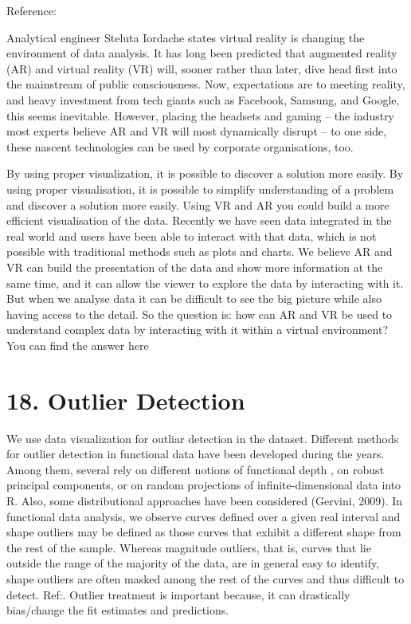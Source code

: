 \documentclass[]{book}
\theoremstyle{definition}
\theoremstyle{definition}
\theoremstyle{definition}
\theoremstyle{remark}
\begin{document}
Reference:\citep{ref_pdf_ar}

Analytical engineer Steluta Iordache states virtual reality is changing
the environment of data analysis. It has long been predicted that
augmented reality (AR) and virtual reality (VR) will, sooner rather than
later, dive head first into the mainstream of public consciousness. Now,
expectations are to meeting reality, and heavy investment from tech
giants such as Facebook, Samsung, and Google, this seems inevitable.
However, placing the headsets and gaming -- the industry most experts
believe AR and VR will most dynamically disrupt -- to one side, these
nascent technologies can be used by corporate organisations, too.

By using proper visualization, it is possible to discover a solution
more easily. By using proper visualisation, it is possible to simplify
understanding of a problem and discover a solution more easily. Using VR
and AR you could build a more efficient visualisation of the data.
Recently we have seen data integrated in the real world and users have
been able to interact with that data, which is not possible with
traditional methods such as plots and charts. We believe AR and VR can
build the presentation of the data and show more information at the same
time, and it can allow the viewer to explore the data by interacting
with it. But when we analyse data it can be difficult to see the big
picture while also having access to the detail. So the question is: how
can AR and VR be used to understand complex data by interacting with it
within a virtual environment? You can find the answer
here\citep{vr_education}

\section{18. Outlier Detection}\label{outlier-detection}

We use data visualization for outliar detection in the dataset.
Different methods for outlier detection in functional data have been
developed during the years. Among them, several rely on different
notions of functional depth , on robust principal components, or on
random projections of infinite-dimensional data into R. Also, some
distributional approaches have been considered (Gervini, 2009). In
functional data analysis, we observe curves defined over a given real
interval and shape outliers may be defined as those curves that exhibit
a different shape from the rest of the sample. Whereas magnitude
outliers, that is, curves that lie outside the range of the majority of
the data, are in general easy to identify, shape outliers are often
masked among the rest of the curves and thus difficult to detect.
Ref:\citep{outliar}. Outlier treatment is important because, it can
drastically bias/change the fit estimates and predictions.
\end{document}
